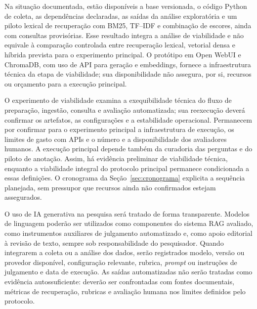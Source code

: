 Na situação documentada, estão disponíveis a base versionada, o código Python de coleta, as dependências declaradas, as saídas da análise exploratória e um piloto lexical de recuperação com BM25, TF--IDF e combinação de escores, ainda com consultas provisórias. Esse resultado integra a análise de viabilidade e não equivale à comparação controlada entre recuperação lexical, vetorial densa e híbrida prevista para o experimento principal. O protótipo em Open WebUI e ChromaDB, com uso de API para geração e embeddings, fornece a infraestrutura técnica da etapa de viabilidade; sua disponibilidade não assegura, por si, recursos ou orçamento para a execução principal.

O experimento de viabilidade examina a exequibilidade técnica do fluxo de preparação, ingestão, consulta e avaliação automatizada; sua reexecução deverá confirmar os artefatos, as configurações e a estabilidade operacional. Permanecem por confirmar para o experimento principal a infraestrutura de execução, os limites de gasto com APIs e o número e a disponibilidade dos avaliadores humanos. A execução principal depende também da curadoria das perguntas e do piloto de anotação. Assim, há evidência preliminar de viabilidade técnica, enquanto a viabilidade integral do protocolo principal permanece condicionada a essas definições. O cronograma da Seção~\ref{sec:cronograma} explicita a sequência planejada, sem pressupor que recursos ainda não confirmados estejam assegurados.

O uso de IA generativa na pesquisa será tratado de forma transparente. Modelos de linguagem poderão ser utilizados como componentes do
sistema RAG avaliado, como instrumentos auxiliares de julgamento automatizado e, como apoio editorial à revisão de texto, sempre sob
responsabilidade do pesquisador. Quando integrarem a coleta ou a análise dos dados, serão registrados modelo, versão ou provedor
disponível, configuração relevante, rubrica, \textit{prompt} ou instruções de julgamento e data de execução. As saídas automatizadas
não serão tratadas como evidência autossuficiente: deverão ser confrontadas com fontes documentais, métricas de recuperação, rubricas
e avaliação humana nos limites definidos pelo protocolo.
